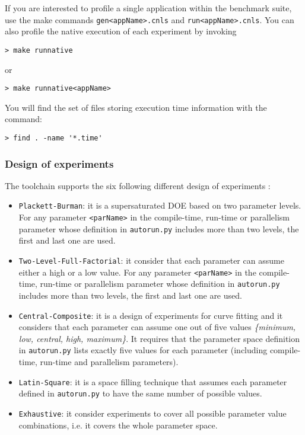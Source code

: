 \documentclass[a4paper, 10pt]{article}
\begin{document}
If you are interested to profile a single application within the benchmark suite, use the make commands
\verb!gen<appName>.cnls! and \verb!run<appName>.cnls!. You can also profile the native execution of each
experiment by invoking 

\begin{Verbatim}[obeytabs, tabsize=4]
> make runnative
\end{Verbatim}
or
\begin{Verbatim}[obeytabs, tabsize=4]
> make runnative<appName>
\end{Verbatim}

You will find the set of files storing execution time information with the command:

\begin{Verbatim}[obeytabs, tabsize=4]
> find . -name '*.time'
\end{Verbatim}

\subsubsection{Design of experiments}
\label{sec:doe}

The toolchain supports the six following different design of experiments \cite{montgomery2012}:
\begin{itemize}
 \item \verb!Plackett-Burman!: it is a supersaturated DOE based on two parameter levels. For any parameter \verb!<parName>!
	in the compile-time, run-time or parallelism parameter whose definition in \verb!autorun.py! includes more than two levels,
	the first and last one are used.
 \item \verb!Two-Level-Full-Factorial!: it consider that each parameter can assume either a high or a low value. For any parameter \verb!<parName>!
	in the compile-time, run-time or parallelism parameter whose definition in \verb!autorun.py! includes more than two levels,
	the first and last one are used.
 \item \verb!Central-Composite!: it is a design of experiments for curve fitting and it considers that each parameter can assume one out of five
	values \textit{\{minimum, low, central, high, maximum\}}. It requires that the parameter space definition in \verb!autorun.py!
	lists exactly five values for each parameter (including compile-time, run-time and parallelism parameters).
 \item \verb!Latin-Square!: it is a space filling technique that assumes each parameter defined in \verb!autorun.py!
	to have the same number of possible values.
 \item \verb!Exhaustive!: it consider experiments to cover all possible parameter value combinations, i.e. it covers the whole parameter space.
\end{itemize}
\end{document}
